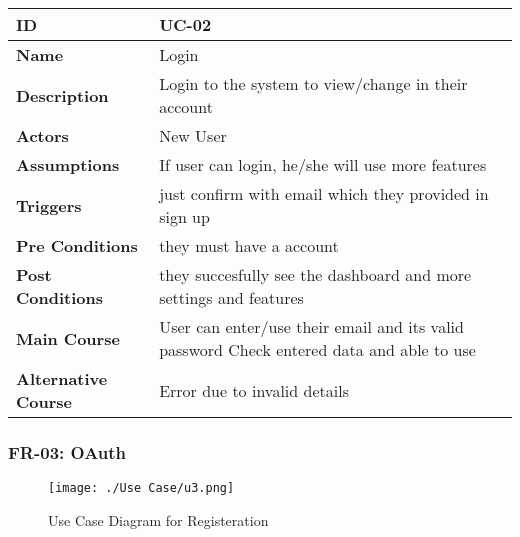     
    \begin{center}
        \begin{tabularx}{\textwidth}{|l|X|}
            \hline
            \textbf{ID} & UC-02 \\
            \hline
            \textbf{Name} & Login \\
            \hline
            \textbf{Description} & Login to the system to view/change in their account \\
            \hline
            \textbf{Actors} & New User \\
            \hline
            \textbf{Assumptions} & If user can login, he/she will use more features \\
            \hline
            \textbf{Triggers} & just confirm with email which they provided in sign up \\
            \hline
            \textbf{Pre Conditions} & they must have a account \\
            \hline
            \textbf{Post Conditions} & they succesfully see the dashboard and more settings and features \\
            \hline
            \textbf{Main Course} & User can enter/use their email and its valid password Check entered data and able to use \\
            \hline
            \textbf{Alternative Course} & Error due to invalid details \\
            \hline
            
        \end{tabularx}
    \end{center}
    \newpage
    

    \subsubsection{FR-03: OAuth}
    \begin{figure}[H]
        \texttt{[image: ./Use Case/u3.png]}
        \centering 
        \caption{Use Case Diagram for Registeration}
        \label{fig:prototype1}
        \end{figure}
        

